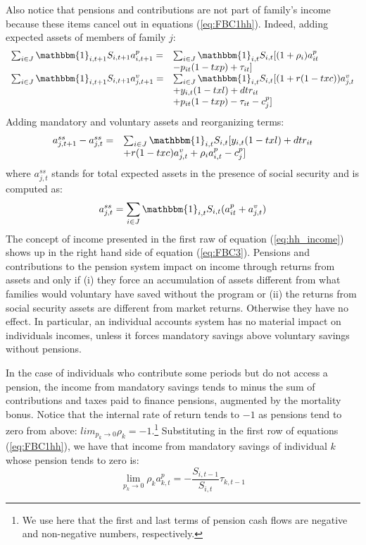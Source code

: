 \documentclass{article}
\begin{document}
\begin{enumerate}
Also notice that pensions and contributions are not part of family's income because these items cancel out in equations (\ref{eq:FBC1hh}). Indeed, adding expected assets of members of family $j$:
\begin{equation} 
\begin{array}{ll}
      \sum_{i\in J} \mathbbm{1}_{i,t+1} S_{i,t+1} a_{i,t+1}^p = &\sum_{i\in J} \mathbbm{1}_{i,t} S_{i,t} [(1+ \rho_i ) a_{it}^p \\
      &- p_{it}(1-txp) +  \tau_{it}]   \\
      \sum_{i\in J} \mathbbm{1}_{i,t+1} S_{i,t+1} a_{j,t+1}^v  =&\sum_{i\in J} \mathbbm{1}_{i,t} S_{i,t} [(1+r(1-txc)) a_{j,t}^v \\
      &+ y_{i,t}(1-txl) +dtr_{it}\\
      &+ p_{it}(1-txp) -  \tau_{it} - c_{j}^p] 
\end{array}
\end{equation}
Adding mandatory and voluntary assets and reorganizing terms:
\begin{equation} 	\label{eq:FBC3}
    \begin{array}{ll}
         a_{j,t+1}^{ss} - a_{j,t}^{ss} = &  \sum_{i\in J} \mathbbm{1}_{i,t} S_{i,t} [y_{i,t}(1-txl)+dtr_{it} \\
    &+ r(1-txc) a_{j,t}^v +\rho_i a_{i,t}^p - c_{j}^p]
    \end{array} 
\end{equation}
where $a_{j,t}^{ss}$ stands for total expected assets in the presence of social security and is computed as:
\[a_{j,t}^{ss} = \sum_{i\in J} \mathbbm{1}_{i,t} S_{i,t}(a_{it}^p + a_{j,t}^v)  \]
The concept of income presented in the first raw of equation (\ref{eq:hh_income}) shows up in the right hand side of equation (\ref{eq:FBC3}). Pensions and contributions to the pension system impact on income through returns from assets and only if (i) they force an accumulation of assets different from what families would voluntary have saved without the program or (ii) the returns from social security assets are different from market returns. Otherwise they have no effect. In particular, an individual accounts system has no material impact on individuals incomes, unless it forces mandatory savings above voluntary savings without pensions. 

In the case of individuals who contribute some periods but do not access a pension, the income from mandatory savings tends to minus the sum of contributions and taxes paid to finance pensions, augmented by the mortality bonus. Notice that the internal rate of return tends to $-1$ as pensions tend to zero from above: $lim_{p_k \to 0} \rho_k = -1$.\footnote{We use here that the first and last terms of pension cash flows are negative and non-negative numbers, respectively.} Substituting in the first row of equations (\ref{eq:FBC1hh}), we have that income from mandatory savings of individual $k$ whose pension tends to zero is:   
 \begin{equation} \label{eq:income_no_access}
     \lim_{p_k \to 0} \rho_k a_{k,t}^p  = - \frac{ S_{i,t-1}}{S_{i,t}}  \tau_{k,t-1}
 \end{equation}
 

\end{enumerate}
\end{document}
